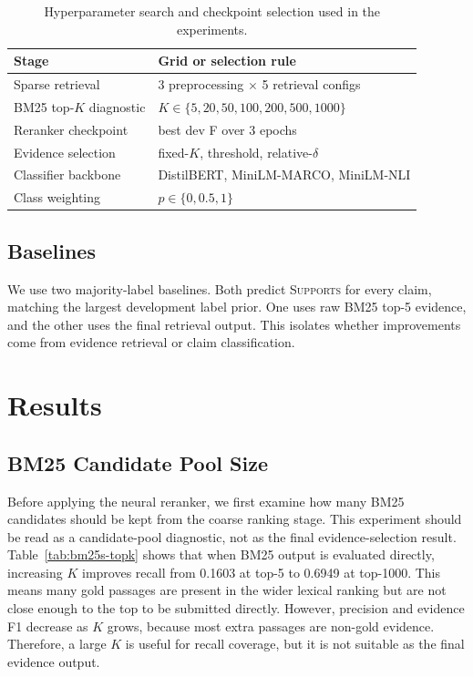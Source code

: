 \documentclass[11pt]{article}
\begin{document}
\begin{table}[t]
  \centering
  \small
  \setlength{\tabcolsep}{3.5pt}
  \begin{tabular}{@{}p{}p{}@{}}
    \toprule
    \textbf{Stage} & \textbf{Grid or selection rule} \\
    \midrule
    Sparse retrieval & 3 preprocessing $\times$ 5 retrieval configs \\
    BM25 top-$K$ diagnostic & $K \in \{5,20,50,100,200,500,1000\}$ \\
    Reranker checkpoint & best dev F over 3 epochs \\
    Evidence selection & fixed-$K$, threshold, relative-$\delta$ \\
    Classifier backbone & DistilBERT, MiniLM-MARCO, MiniLM-NLI \\
    Class weighting & $p \in \{0,0.5,1\}$ \\
    \bottomrule
  \end{tabular}
  \caption{Hyperparameter search and checkpoint selection used in the experiments.}
  \label{tab:search-space}
\end{table}


\subsection{Baselines}

We use two majority-label baselines. Both predict \textsc{Supports} for every claim, matching the largest development label prior. One uses raw BM25 top-5 evidence, and the other uses the final retrieval output. This isolates whether improvements come from evidence retrieval or claim classification.

\section{Results}

\subsection{BM25 Candidate Pool Size}

Before applying the neural reranker, we first examine how many BM25 candidates should be kept from the coarse ranking stage. This experiment should be read as a candidate-pool diagnostic, not as the final evidence-selection result. Table~\ref{tab:bm25s-topk} shows that when BM25 output is evaluated directly, increasing $K$ improves recall from 0.1603 at top-5 to 0.6949 at top-1000. This means many gold passages are present in the wider lexical ranking but are not close enough to the top to be submitted directly. However, precision and evidence F1 decrease as $K$ grows, because most extra passages are non-gold evidence. Therefore, a large $K$ is useful for recall coverage, but it is not suitable as the final evidence output.
\end{document}
